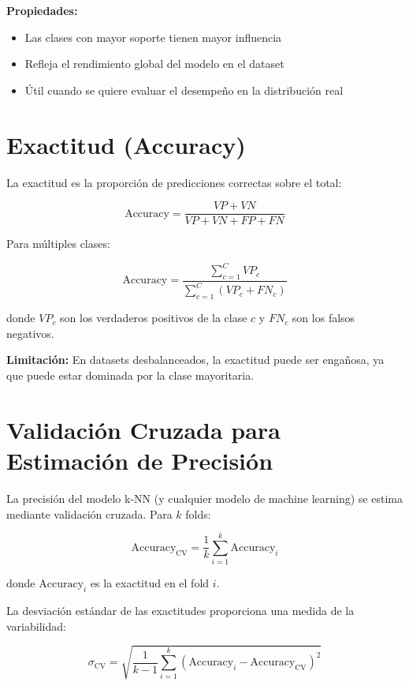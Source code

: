 \documentclass[12pt]{article}
\begin{document}
\textbf{Propiedades:}
\begin{itemize}
\item Las clases con mayor soporte tienen mayor influencia
\item Refleja el rendimiento global del modelo en el dataset
\item Útil cuando se quiere evaluar el desempeño en la distribución real
\end{itemize}

\section{Exactitud (Accuracy)}

La exactitud es la proporción de predicciones correctas sobre el total:

\begin{equation}
\text{Accuracy} = \frac{VP + VN}{VP + VN + FP + FN}
\end{equation}

Para múltiples clases:

\begin{equation}
\text{Accuracy} = \frac{\sum_{c=1}^{C} VP_c}{\sum_{c=1}^{C} (VP_c + FN_c)}
\end{equation}

donde $VP_c$ son los verdaderos positivos de la clase $c$ y $FN_c$ son los falsos negativos.

\textbf{Limitación:} En datasets desbalanceados, la exactitud puede ser engañosa, ya que puede estar dominada por la clase mayoritaria.

\section{Validación Cruzada para Estimación de Precisión}

La precisión del modelo k-NN (y cualquier modelo de machine learning) se estima mediante validación cruzada. Para $k$ folds:

\begin{equation}
\text{Accuracy}_{\text{CV}} = \frac{1}{k} \sum_{i=1}^{k} \text{Accuracy}_i
\end{equation}

donde $\text{Accuracy}_i$ es la exactitud en el fold $i$.

La desviación estándar de las exactitudes proporciona una medida de la variabilidad:

\begin{equation}
\sigma_{\text{CV}} = \sqrt{\frac{1}{k-1} \sum_{i=1}^{k} (\text{Accuracy}_i - \text{Accuracy}_{\text{CV}})^2}
\end{equation}
\end{document}
